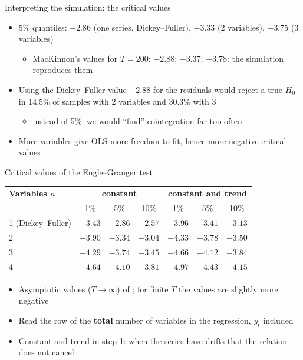 \begin{frame}{Interpreting the simulation: the critical values}
\itemsize{\small}
\begin{itemize}
    \item 5\% quantiles: $-2.86$ (one series, Dickey--Fuller), $-3.33$ (2 variables), $-3.75$ (3 variables)
    \begin{itemize}
        \item MacKinnon's values for $T = 200$: $-2.88$; $-3.37$; $-3.78$: the simulation reproduces them
    \end{itemize}
    \item Using the Dickey--Fuller value $-2.88$ for the residuals would reject a true $H_0$ in 14.5\% of samples with 2 variables and 30.3\% with 3
    \begin{itemize}
        \item instead of 5\%: we would ``find'' cointegration far too often
    \end{itemize}
    \item More variables give OLS more freedom to fit, hence more negative critical values
\end{itemize}
\end{frame}

\begin{frame}{Critical values of the Engle--Granger test}
\itemsize{\small}
\begin{center}
\footnotesize
\begin{tabular}{lcccccc}
\toprule
\textbf{Variables $n$} & \multicolumn{3}{c}{\textbf{constant}} & \multicolumn{3}{c}{\textbf{constant and trend}} \\
 & 1\% & 5\% & 10\% & 1\% & 5\% & 10\% \\
\midrule
1 (Dickey--Fuller) & $-3.43$ & $-2.86$ & $-2.57$ & $-3.96$ & $-3.41$ & $-3.13$ \\
2 & $-3.90$ & $-3.34$ & $-3.04$ & $-4.33$ & $-3.78$ & $-3.50$ \\
3 & $-4.29$ & $-3.74$ & $-3.45$ & $-4.66$ & $-4.12$ & $-3.84$ \\
4 & $-4.64$ & $-4.10$ & $-3.81$ & $-4.97$ & $-4.43$ & $-4.15$ \\
\bottomrule
\end{tabular}
\end{center}
\begin{itemize}
    \item Asymptotic values ($T \to \infty$) of ; for finite $T$ the values are slightly more negative
    \item Read the row of the \textbf{total} number of variables in the regression, $y_t$ included
    \item Constant and trend in step 1: when the series have drifts that the relation does not cancel
\end{itemize}
\end{frame}

